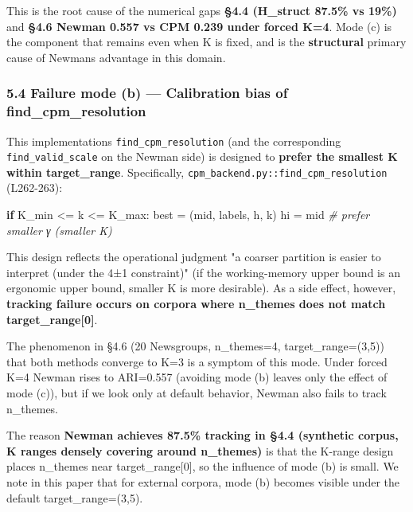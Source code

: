 \documentclass[
]{article}
\newenvironment{Shaded}{}{}
\newcommand{\CommentTok}[1]{\textcolor[rgb]{0.38,0.63,0.69}{\textit{#1}}}
\newcommand{\ControlFlowTok}[1]{\textcolor[rgb]{0.00,0.44,0.13}{\textbf{#1}}}
\newcommand{\NormalTok}[1]{#1}
\newcommand{\OperatorTok}[1]{\textcolor[rgb]{0.40,0.40,0.40}{#1}}
\begin{document}
This is the root cause of the numerical gaps \textbf{§4.4 (H\_struct
87.5\% vs 19\%)} and \textbf{§4.6 Newman 0.557 vs CPM 0.239 under forced
K=4}. Mode (c) is the component that remains even when K is fixed, and
is the \textbf{structural} primary cause of Newman\textquotesingle s
advantage in this domain.

\subsubsection{5.4 Failure mode (b) --- Calibration bias of
find\_cpm\_resolution}\label{54-failure-mode-b--calibration-bias-of-find_cpm_resolution}

This implementation\textquotesingle s \texttt{find\_cpm\_resolution}
(and the corresponding \texttt{find\_valid\_scale} on the Newman side)
is designed to \textbf{prefer the smallest K within target\_range}.
Specifically, \texttt{cpm\_backend.py::find\_cpm\_resolution}
(L262-263):

\begin{Shaded}
\begin{Highlighting}[]
\ControlFlowTok{if}\NormalTok{ K\_min }\OperatorTok{\textless{}=}\NormalTok{ k }\OperatorTok{\textless{}=}\NormalTok{ K\_max:}
\NormalTok{    best }\OperatorTok{=}\NormalTok{ (mid, labels, h, k)}
\NormalTok{    hi }\OperatorTok{=}\NormalTok{ mid  }\CommentTok{\# prefer smaller γ (smaller K)}
\end{Highlighting}
\end{Shaded}

This design reflects the operational judgment "a coarser partition is
easier to interpret (under the 4±1 constraint)" (if the working-memory
upper bound is an ergonomic upper bound, smaller K is more desirable).
As a side effect, however, \textbf{tracking failure occurs on corpora
where n\_themes does not match target\_range{[}0{]}}.

The phenomenon in §4.6 (20 Newsgroups, n\_themes=4, target\_range=(3,5))
that both methods converge to K=3 is a symptom of this mode. Under
forced K=4 Newman rises to ARI=0.557 (avoiding mode (b) leaves only the
effect of mode (c)), but if we look only at default behavior, Newman
also fails to track n\_themes.

The reason \textbf{Newman achieves 87.5\% tracking in §4.4 (synthetic
corpus, K ranges densely covering around n\_themes)} is that the K-range
design places n\_themes near target\_range{[}0{]}, so the influence of
mode (b) is small. We note in this paper that for external corpora, mode
(b) becomes visible under the default target\_range=(3,5).
\end{document}
